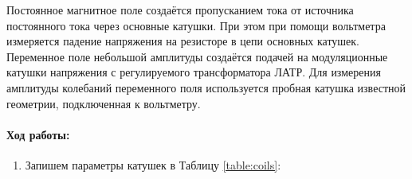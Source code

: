 \documentclass[a4paper,12pt]{article}
\begin{document}
	Постоянное магнитное поле создаётся пропусканием тока от источника постоянного тока через основные катушки. При этом при помощи вольтметра измеряется падение напряжения на резисторе в цепи основных катушек. Переменное поле небольшой амплитуды создаётся подачей на модуляционные катушки напряжения с регулируемого трансформатора ЛАТР. Для измерения амплитуды колебаний переменного поля используется пробная катушка известной геометрии, подключенная к вольтметру.
	
\newpage
\paragraph{Ход работы:}
\begin{enumerate}
\itemsep0em
\item  Запишем параметры катушек в  Таблицу \ref{table:coils}:
	    

\end{enumerate}
\end{document}
